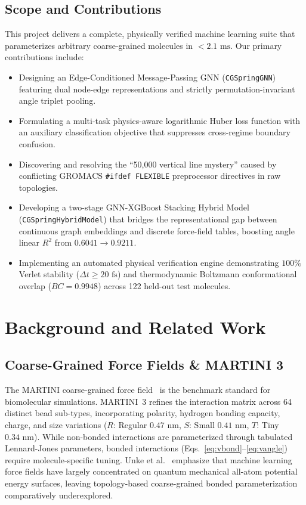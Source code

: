 \documentclass[11pt,a4paper]{article}
\begin{document}
\subsection{Scope and Contributions}
This project delivers a complete, physically verified machine learning suite that parameterizes arbitrary coarse-grained molecules in $< 2.1\text{ ms}$. Our primary contributions include:
\begin{itemize}
    \item Designing an Edge-Conditioned Message-Passing GNN (\texttt{CGSpringGNN}) featuring dual node-edge representations and strictly permutation-invariant angle triplet pooling.
    \item Formulating a multi-task physics-aware logarithmic Huber loss function with an auxiliary classification objective that suppresses cross-regime boundary confusion.
    \item Discovering and resolving the ``50,000 vertical line mystery'' caused by conflicting GROMACS \texttt{\#ifdef FLEXIBLE} preprocessor directives in raw topologies.
    \item Developing a two-stage GNN-XGBoost Stacking Hybrid Model (\texttt{CGSpringHybridModel}) that bridges the representational gap between continuous graph embeddings and discrete force-field tables, boosting angle linear $R^2$ from $0.6041 \to \mathbf{0.9211}$.
    \item Implementing an automated physical verification engine demonstrating $100\%$ Verlet stability ($\Delta t \ge 20\text{ fs}$) and thermodynamic Boltzmann conformational overlap ($BC = 0.9948$) across 122 held-out test molecules.
\end{itemize}

\section{Background and Related Work}
\label{sec:background}

\subsection{Coarse-Grained Force Fields \& MARTINI 3}
The MARTINI coarse-grained force field~\cite{marrink2007martini,souza2021martini3} is the benchmark standard for biomolecular simulations. MARTINI~3 refines the interaction matrix across 64 distinct bead sub-types, incorporating polarity, hydrogen bonding capacity, charge, and size variations ($R$: Regular $0.47\text{ nm}$, $S$: Small $0.41\text{ nm}$, $T$: Tiny $0.34\text{ nm}$). While non-bonded interactions are parameterized through tabulated Lennard-Jones parameters, bonded interactions (Eqs.~\ref{eq:vbond}--\ref{eq:vangle}) require molecule-specific tuning. Unke et al.~\cite{unke2021machine} emphasize that machine learning force fields have largely concentrated on quantum mechanical all-atom potential energy surfaces, leaving topology-based coarse-grained bonded parameterization comparatively underexplored.
\end{document}
